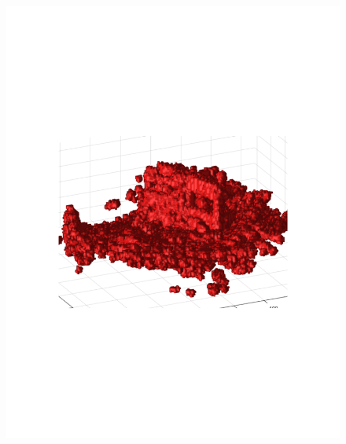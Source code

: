 \documentclass{UCF_ETD}
\begin{document}
\begin{figure}[H] 
\begin{center}
\includegraphics[scale=0.5]{RobustRegistration/IntegratedPlotOf30ScansSurfaceData}

\end{center}
\end{figure}
\end{document}
